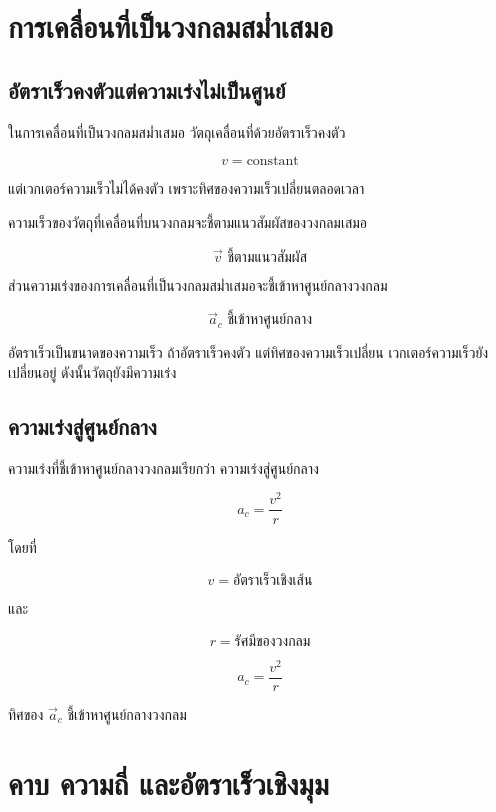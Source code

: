 \newpage{}

\section{การเคลื่อนที่เป็นวงกลมสม่ำเสมอ}

\subsection{อัตราเร็วคงตัวแต่ความเร่งไม่เป็นศูนย์}

ในการเคลื่อนที่เป็นวงกลมสม่ำเสมอ วัตถุเคลื่อนที่ด้วยอัตราเร็วคงตัว

\[
v=\text{constant}
\]

แต่เวกเตอร์ความเร็วไม่ได้คงตัว เพราะทิศของความเร็วเปลี่ยนตลอดเวลา

ความเร็วของวัตถุที่เคลื่อนที่บนวงกลมจะชี้ตามแนวสัมผัสของวงกลมเสมอ

\[
\vec{v} \text{ ชี้ตามแนวสัมผัส}
\]

ส่วนความเร่งของการเคลื่อนที่เป็นวงกลมสม่ำเสมอจะชี้เข้าหาศูนย์กลางวงกลม

\[
\vec{a}_c \text{ ชี้เข้าหาศูนย์กลาง}
\]

\begin{tcolorbox}[title=ข้อควรจำ]
อัตราเร็วเป็นขนาดของความเร็ว ถ้าอัตราเร็วคงตัว แต่ทิศของความเร็วเปลี่ยน เวกเตอร์ความเร็วยังเปลี่ยนอยู่ ดังนั้นวัตถุยังมีความเร่ง
\end{tcolorbox}

\subsection{ความเร่งสู่ศูนย์กลาง}

ความเร่งที่ชี้เข้าหาศูนย์กลางวงกลมเรียกว่า ความเร่งสู่ศูนย์กลาง

\[
a_c=\frac{v^2}{r}
\]

โดยที่

\[
v=\text{อัตราเร็วเชิงเส้น}
\]

และ

\[
r=\text{รัศมีของวงกลม}
\]

\begin{tcolorbox}[title=ความเร่งสู่ศูนย์กลาง]
\[
a_c=\frac{v^2}{r}
\]

ทิศของ $\vec{a}_c$ ชี้เข้าหาศูนย์กลางวงกลม
\end{tcolorbox}

\section{คาบ ความถี่ และอัตราเร็วเชิงมุม}

